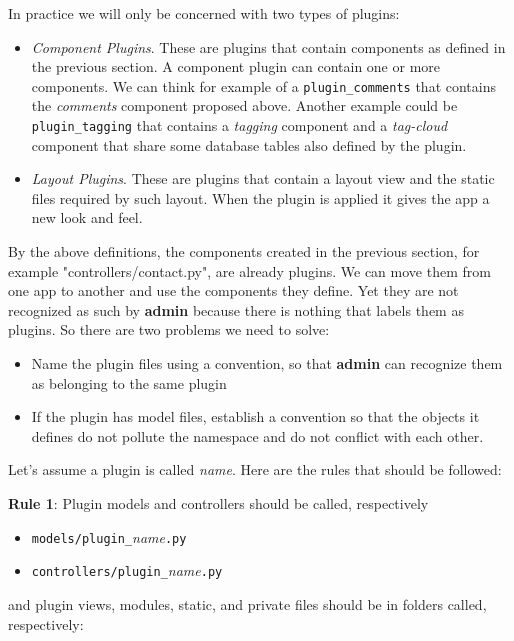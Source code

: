 \documentclass[justified,sixbynine,notoc]{tufte-book}
\def\ft{\small\tt}
\begin{document}
\begin{fullwidth}
In practice we will only be concerned with two types of plugins:

\begin{itemize}
\item {\it Component Plugins}. These are plugins that contain components as defined in the previous section. A component plugin can contain one or more components. We can think for example of a {\ft plugin\_comments} that contains the {\it comments} component proposed above. Another example could be {\ft plugin\_tagging} that contains a {\it tagging} component and a {\it tag-cloud} component that share some database tables also defined by the plugin.

\item {\it Layout Plugins}. These are plugins that contain a layout view and the static files required by such layout. When the plugin is applied it gives the app a new look and feel.
\end{itemize}

By the above definitions, the components created in the previous section, for example "controllers/contact.py", are already plugins. We can move them from one app to another and use the components they define. Yet they are not recognized as such by {\bf admin} because there is nothing that labels them as plugins. So there are two problems we need to solve:

\begin{itemize}
\item Name the plugin files using a convention, so that {\bf admin} can recognize them as belonging to the same plugin

\item If the plugin has model files, establish a convention so that the objects it defines do not pollute the namespace and do not conflict with each other.
\end{itemize}

Let's assume a plugin is called {\it name}. Here are the rules that should be followed:

{\bf Rule 1}:
Plugin models and controllers should be called, respectively

\begin{itemize}
\item {\ft models/plugin\_}{\it name}{\ft .py}

\item {\ft controllers/plugin\_}{\it name}{\ft .py}
\end{itemize}
\noindent and plugin views, modules, static, and private files should be in folders called, respectively:


\end{fullwidth}
\end{document}
